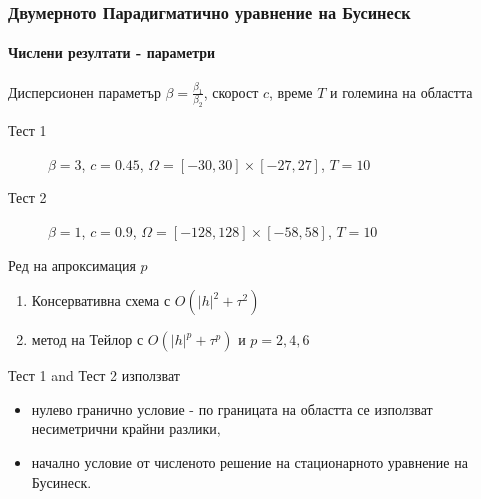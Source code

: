 \documentclass{beamer}
\begin{document}
\begin{frame}
\frametitle{Двумерното Парадигматично уравнение на Бусинеск}
\framesubtitle{Числени резултати - параметри}

Дисперсионен параметър $\beta= \frac{\beta_1}{\beta_2}$, скорост $c$, време $T$ и големина на областта
\begin{description}
 \item[Тест 1] $\beta = 3$, $c = 0.45$, $\Omega = [-30, 30] \times [-27, 27]$, $T = 10$
 \item[Тест 2] $\beta = 1$, $c = 0.9$, $\Omega = [-128, 128] \times [-58, 58]$, $T = 10$
\end{description}

Ред на апроксимация $p$
\begin{enumerate}
  \item Консервативна схема с $O(|h|^2 + \tau^2)$
  \item метод на Тейлор с $O(|h|^p + \tau^p)$ и $p = 2, 4, 6$
\end{enumerate}

Тест 1 and Тест 2 използват 
\begin{itemize} 
\item нулево гранично условие - по границата на областта се използват несиметрични крайни разлики,
\item начално условие от численото решение на стационарното уравнение на Бусинеск.
\end{itemize}
\end{frame}

\end{document}
